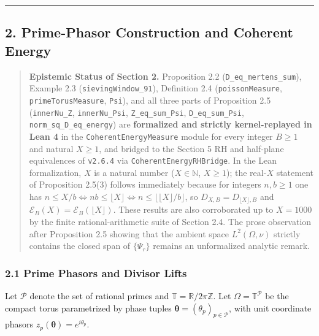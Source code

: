 \documentclass[11pt]{article}
\begin{document}
\begin{center}\rule{0.5\linewidth}{0.5pt}\end{center}

\subsection{2. Prime-Phasor Construction and Coherent Energy}\label{2-prime-phasor-construction-and-coherent-energy}

\begin{quote}
\textbf{Epistemic Status of Section 2.} Proposition 2.2 (\texttt{D\_eq\_mertens\_sum}), Example 2.3 (\texttt{sievingWindow\_91}), Definition 2.4 (\texttt{poissonMeasure}, \texttt{primeTorusMeasure}, \texttt{Psi}), and all three parts of Proposition 2.5 (\texttt{innerNu\_Z}, \texttt{innerNu\_Psi}, \texttt{Z\_eq\_sum\_Psi}, \texttt{D\_eq\_sum\_Psi}, \texttt{norm\_sq\_D\_eq\_energy}) are \textbf{formalized and strictly kernel-replayed in Lean 4} in the \texttt{CoherentEnergyMeasure} module for every integer \(B \ge 1\) and natural \(X \ge 1\), and bridged to the Section 5 RH and half-plane equivalences of \texttt{v2.6.4} via \texttt{CoherentEnergyRHBridge}. In the Lean formalization, \(X\) is a natural number (\(X \in \mathbb{N}\), \(X \ge 1\)); the real-\(X\) statement of Proposition 2.5(3) follows immediately because for integers \(n, b \ge 1\) one has \(n \le X/b \iff nb \le \lfloor X \rfloor \iff n \le \lfloor \lfloor X \rfloor / b \rfloor\), so \(D_{X,B} = D_{\lfloor X \rfloor, B}\) and \(\mathscr{E}_B(X) = \mathscr{E}_B(\lfloor X \rfloor)\). These results are also corroborated up to \(X = 1000\) by the finite rational-arithmetic suite of Section 2.4. The prose observation after Proposition 2.5 showing that the ambient space \(L^2(\Omega, \nu)\) strictly contains the closed span of \(\{\Psi_r\}\) remains an unformalized analytic remark.
\end{quote}

\subsubsection{2.1 Prime Phasors and Divisor Lifts}\label{21-prime-phasors-and-divisor-lifts}

Let \(\mathcal{P}\) denote the set of rational primes and \(\mathbb{T} = \mathbb{R}/2\pi\mathbb{Z}\). Let \(\Omega = \mathbb{T}^{\mathcal{P}}\) be the compact torus parametrized by phase tuples \(\boldsymbol{\theta} = (\theta_p)_{p \in \mathcal{P}}\), with unit coordinate phasors \(z_p(\boldsymbol{\theta}) = e^{i\theta_p}\).
\end{document}
